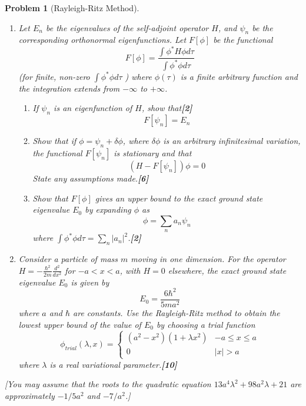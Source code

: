 \documentclass[a4paper]{article}
\theoremstyle{new}
\newtheorem{qns}{Problem}[section]
\begin{document}
\begin{qns}[Rayleigh-Ritz Method]\leavevmode
\begin{enumerate}[label=(\alph*)]
\item Let $E_n$ be the eigenvalues of the self-adjoint operator $H$, and $\psi_n$ be the corresponding orthonormal eigenfunctions. Let $F[\phi]$ be the functional
$$F[\phi]=\frac{\int\phi^*H\phi d\tau}{\int \phi^*\phi d\tau}$$
(for finite, non-zero $\int\phi^*\phi d\tau$ ) where $\phi(\tau)$ is a finite arbitrary function and the integration extends from $-\infty$ to $+\infty$.
\begin{enumerate}[label=(\roman*)]
\item If $\psi_n$ is an eigenfunction of $H$, show that\hfill\textbf{[2]}
$$F[\psi_n]=E_n$$
\item Show that if $\phi=\psi_n+\delta\phi$, where $\delta\phi$ is an arbitrary infinitesimal variation, the functional $F[\psi_n]$ is stationary and that
$$(H − F[\psi_n])\phi= 0$$
State any assumptions made.\hfill\textbf{[6]}
\item Show that $F[\phi]$ gives an upper bound to the exact ground state eigenvalue $E_0$ by expanding $\phi$ as
$$\phi=\sum_na_n\psi_n$$
where $\int\phi^*\phi d\tau=\sum_n|a_n|^2$.\hfill\textbf{[2]}
\end{enumerate}
\item Consider a particle of mass $m$ moving in one dimension. For the operator $H =-\frac{\hbar^2}{2m}\frac{d^2}{dx^2}$ for $-a<x<a$, with $H = 0$ elsewhere, the exact ground state eigenvalue $E_0$ is given by
$$E_0=\frac{6\hbar^2}{5ma^2}$$
where $a$ and $\hbar$ are constants. Use the Rayleigh-Ritz method to obtain the lowest upper bound of the value of $E_0$ by choosing a trial function
$$\phi_{trial}(\lambda,x)=
\left\{
        \begin{array}{ll}
      (a^2-x^2)(1+\lambda x^2) & -a\leq x\leq a \\
      0 & |x|>a
        \end{array}
    \right.$$
where $\lambda$ is a real variational parameter.\hfill\textbf{[10]}
\end{enumerate}
[You may assume that the roots to the quadratic equation $13a^4\lambda^2+98a^2\lambda+21$ are approximately $−1/5a^2$ and $−7/a^2$.]
\end{qns}
\newpage
\end{document}
